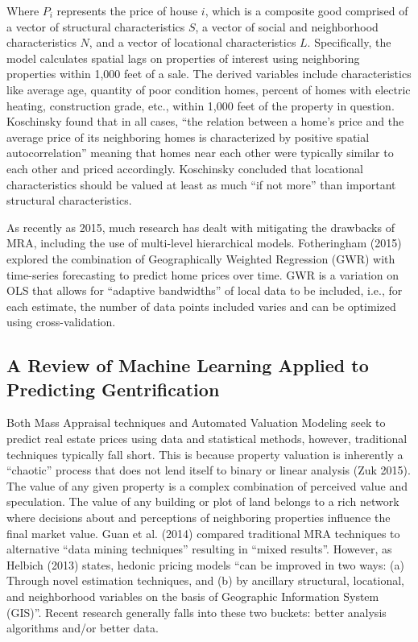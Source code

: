 \documentclass[12pt,]{article}
\begin{document}
Where \(P_i\) represents the price of house \(i\), which is a composite
good comprised of a vector of structural characteristics \(S\), a vector
of social and neighborhood characteristics \(N\), and a vector of
locational characteristics \(L\). Specifically, the model calculates
spatial lags on properties of interest using neighboring properties
within 1,000 feet of a sale. The derived variables include
characteristics like average age, quantity of poor condition homes,
percent of homes with electric heating, construction grade, etc., within
1,000 feet of the property in question. Koschinsky found that in all
cases, ``the relation between a home's price and the average price of
its neighboring homes is characterized by positive spatial
autocorrelation'' meaning that homes near each other were typically
similar to each other and priced accordingly. Koschinsky concluded that
locational characteristics should be valued at least as much ``if not
more'' than important structural characteristics.

As recently as 2015, much research has dealt with mitigating the
drawbacks of MRA, including the use of multi-level hierarchical models.
Fotheringham (2015) explored the combination of Geographically Weighted
Regression (GWR) with time-series forecasting to predict home prices
over time. GWR is a variation on OLS that allows for ``adaptive
bandwidths'' of local data to be included, i.e., for each estimate, the
number of data points included varies and can be optimized using
cross-validation.

\hypertarget{a-review-of-machine-learning-applied-to-predicting-gentrification}{%
\subsection{A Review of Machine Learning Applied to Predicting
Gentrification}\label{a-review-of-machine-learning-applied-to-predicting-gentrification}}

Both Mass Appraisal techniques and Automated Valuation Modeling seek to
predict real estate prices using data and statistical methods, however,
traditional techniques typically fall short. This is because property
valuation is inherently a ``chaotic'' process that does not lend itself
to binary or linear analysis (Zuk 2015). The value of any given property
is a complex combination of perceived value and speculation. The value
of any building or plot of land belongs to a rich network where
decisions about and perceptions of neighboring properties influence the
final market value. Guan et al. (2014) compared traditional MRA
techniques to alternative ``data mining techniques'' resulting in
``mixed results''. However, as Helbich (2013) states, hedonic pricing
models ``can be improved in two ways: (a) Through novel estimation
techniques, and (b) by ancillary structural, locational, and
neighborhood variables on the basis of Geographic Information System
(GIS)''. Recent research generally falls into these two buckets: better
analysis algorithms and/or better data.
\end{document}
